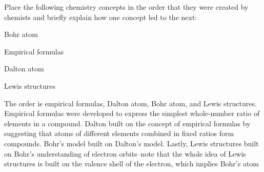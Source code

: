 \begin{sample}{Place the following chemistry concepts in the order that they were created by
    chemists and briefly explain how one concept led to the next:
    \begin{enum-alph}
        \item Bohr atom
        \item Empirical formulas
        \item Dalton atom
        \item Lewis structures
    \end{enum-alph}
}
    The order is empirical formulas, Dalton atom, Bohr atom, and Lewis structures. Empirical
    formulas were developed to express the simplest whole-number ratio of elements in a compound.
    Dalton built on the concept of empirical formulas by suggesting that atoms of different 
    elements combined in fixed ratios form compounds. Bohr's model built on Dalton's model.
    Lastly, Lewis structures built on Bohr's understanding of electron orbits--note that the
    whole idea of Lewis structures is built on the valence shell of the electron, which implies
    Bohr's atom
\end{sample}
